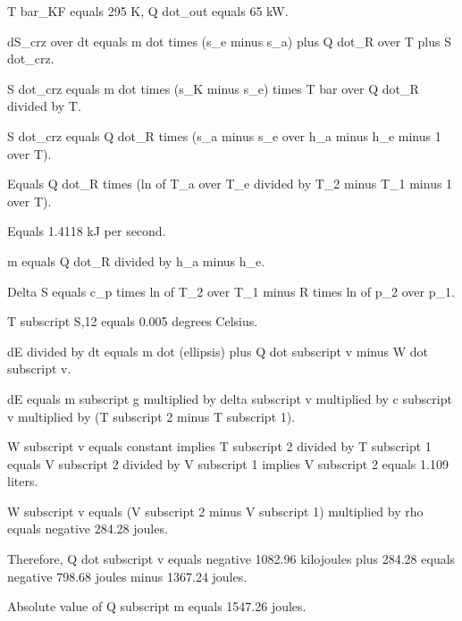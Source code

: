 T bar_KF equals 295 K, Q dot_out equals 65 kW.  

dS_crz over dt equals m dot times (s_e minus s_a) plus Q dot_R over T plus S dot_crz.  

S dot_crz equals m dot times (s_K minus s_e) times T bar over Q dot_R divided by T.  

S dot_crz equals Q dot_R times (s_a minus s_e over h_a minus h_e minus 1 over T).  

Equals Q dot_R times (ln of T_a over T_e divided by T_2 minus T_1 minus 1 over T).  

Equals 1.4118 kJ per second.  

m equals Q dot_R divided by h_a minus h_e.  

Delta S equals c_p times ln of T_2 over T_1 minus R times ln of p_2 over p_1.

T subscript S,12 equals 0.005 degrees Celsius.  

dE divided by dt equals m dot (ellipsis) plus Q dot subscript v minus W dot subscript v.  

dE equals m subscript g multiplied by delta subscript v multiplied by c subscript v multiplied by (T subscript 2 minus T subscript 1).  

W subscript v equals constant implies T subscript 2 divided by T subscript 1 equals V subscript 2 divided by V subscript 1 implies V subscript 2 equals 1.109 liters.  

W subscript v equals (V subscript 2 minus V subscript 1) multiplied by rho equals negative 284.28 joules.  

Therefore, Q dot subscript v equals negative 1082.96 kilojoules plus 284.28 equals negative 798.68 joules minus 1367.24 joules.  

Absolute value of Q subscript m equals 1547.26 joules.